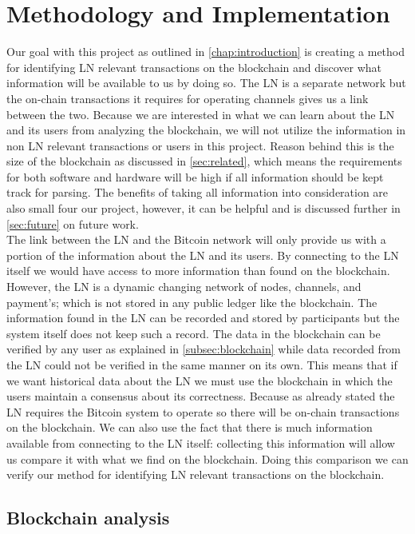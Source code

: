 \chapter{Methodology and Implementation}
\label{chap:metodology}

Our goal with this project as outlined in \cref{chap:introduction} is creating a method for identifying LN relevant transactions on the blockchain and discover what information will be available to us by doing so. The LN is a separate network but the on-chain transactions it requires for operating channels gives us a link between the two. Because we are interested in what we can learn about the LN and its users from analyzing the blockchain, we will not utilize the information in non LN relevant transactions or users in this project. Reason behind this is the size of the blockchain as discussed in \cref{sec:related}, which means the requirements for both software and hardware will be high if all information should be kept track for parsing. The benefits of taking all information into consideration are also small four our project, however, it can be helpful and is discussed further in \cref{sec:future} on future work. 
\\

The link between the LN and the Bitcoin network will only provide us with a portion of the information about the LN and its users. By connecting to the LN itself we would have access to more information than found on the blockchain. However, the LN is a dynamic changing network of nodes, channels, and payment's; which is not stored in any public ledger like the blockchain. The information found in the LN can be recorded and stored by participants but the system itself does not keep such a record. The data in the blockchain can be verified by any user as explained in \cref{subsec:blockchain} while data recorded from the LN could not be verified in the same manner on its own.
This means that if we want historical data about the LN we must use the blockchain in which the users maintain a consensus about its correctness. Because as already stated the LN requires the Bitcoin system to operate so there will be on-chain transactions on the blockchain. We can also use the fact that there is much information available from connecting to the LN itself: collecting this information will allow us compare it with what we find on the blockchain. Doing this comparison we can verify our method for identifying LN relevant transactions on the blockchain. 

\section{Blockchain analysis}

